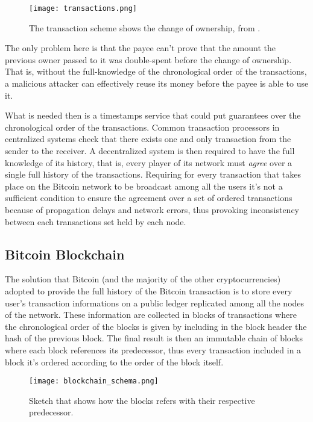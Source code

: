 		\begin{figure}
			\caption{The transaction scheme shows the change of ownership, from \cite{Nakamoto2008}.}
			\texttt{[image: transactions.png]}
			\centering	
		\end{figure}
		
		The only problem here is that the payee can't prove that the amount the previous owner passed to it was double-spent before the change of ownership. That is, without the full-knowledge of the chronological order of the transactions, a malicious attacker can effectively reuse its money before the payee is able to use it. 
		
		What is needed then is a timestamps service that could put guarantees over the chronological order of the transactions. Common transaction processors in centralized systems check that there exists one and only transaction from the sender to the receiver. A decentralized system is then required to have the full knowledge of its history, that is, every player of its network must \textit{agree} over a single full history of the transactions. Requiring for every transaction that takes place on the Bitcoin network to be broadcast among all the users it's not a sufficient condition to ensure the agreement over a set of ordered transactions because of propagation delays and network errors, thus provoking inconsistency between each transactions set held by each node.
		
	\subsection{Bitcoin Blockchain}
		The solution that Bitcoin (and the majority of the other cryptocurrencies) adopted to provide the full history of the Bitcoin transaction is to store every user's transaction informations on a public ledger replicated among all the nodes of the network. These information are collected in blocks of transactions where the chronological order of the blocks is given by including in the block header the hash of the previous block. The final result is then an immutable chain of blocks where each block references its predecessor, thus every transaction included in a block it's ordered according to the order of the block itself.
		
		\begin{figure}
			\caption{Sketch that shows how the blocks refers with their respective predecessor.}
			\texttt{[image: blockchain\_schema.png]}
			\centering	
		\end{figure}
		
